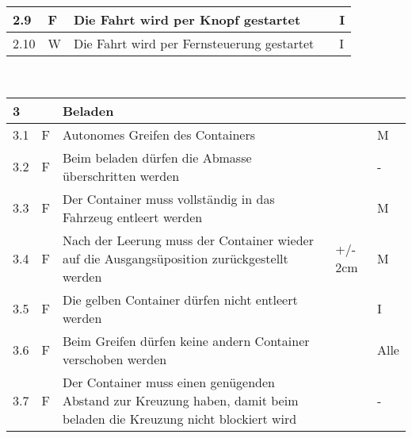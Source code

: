 \begin{center}
\begin{tabular}{|p{1cm}|p{0.5cm}|p{5cm}|p{5cm}|p{1.5cm}|}
 2.9 & F & Die Fahrt wird per Knopf gestartet & & I\\\hline
 2.10 & W & Die Fahrt wird per Fernsteuerung gestartet & & I \\\hline
\end{tabular}\\[0.3cm]
\begin{tabular}{|p{1cm}|p{0.5cm}|p{5cm}|p{5cm}|p{1.5cm}|}\hline
 \textbf{3} & & \textbf{Beladen} & & \\\hline
 3.1 & F & Autonomes Greifen des Containers & & M\\\hline
 3.2 & F & Beim beladen dürfen die Abmasse überschritten werden & & -\\\hline
 3.3 & F & Der Container muss vollständig in das Fahrzeug entleert werden & & M\\\hline
 3.4 & F & Nach der Leerung muss der Container wieder auf die Ausgangsüposition zurückgestellt werden & +/- 2cm & M\\\hline
 3.5 & F & Die gelben Container dürfen nicht entleert werden & & I\\\hline
 3.6 & F & Beim Greifen dürfen keine andern Container verschoben werden & & Alle\\\hline
 3.7 & F & Der Container muss einen genügenden Abstand zur Kreuzung haben, damit beim beladen die Kreuzung nicht blockiert wird & & - \\\hline   
\end{tabular}
\end{center}
